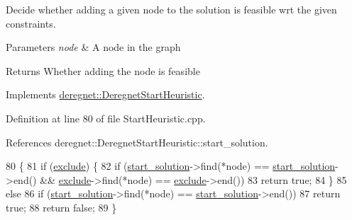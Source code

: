 Decide whether adding a given node to the solution is feasible wrt the given constraints. 


\begin{DoxyParams}{Parameters}
{\em node} & A node in the graph\\
\hline
\end{DoxyParams}
\begin{DoxyReturn}{Returns}
Whether adding the node is feasible 
\end{DoxyReturn}


Implements \hyperlink{classderegnet_1_1DeregnetStartHeuristic_ac296c4f122f7d3ad2fcc2cbb0d1b5379}{deregnet\+::\+Deregnet\+Start\+Heuristic}.



Definition at line 80 of file Start\+Heuristic.\+cpp.



References deregnet\+::\+Deregnet\+Start\+Heuristic\+::start\+\_\+solution.


\begin{DoxyCode}
80                                              \{
81     \textcolor{keywordflow}{if} (\hyperlink{classderegnet_1_1DeregnetStartHeuristic_aa22c6581cd404bf7ac325850b28dc951}{exclude}) \{
82         \textcolor{keywordflow}{if} (\hyperlink{classderegnet_1_1DeregnetStartHeuristic_a7450e11ca0a265b055f95e7832b65e2f}{start\_solution}->find(*node) == \hyperlink{classderegnet_1_1DeregnetStartHeuristic_a7450e11ca0a265b055f95e7832b65e2f}{start\_solution}->end() && 
      \hyperlink{classderegnet_1_1DeregnetStartHeuristic_aa22c6581cd404bf7ac325850b28dc951}{exclude}->find(*node) == \hyperlink{classderegnet_1_1DeregnetStartHeuristic_aa22c6581cd404bf7ac325850b28dc951}{exclude}->end())
83             \textcolor{keywordflow}{return} \textcolor{keyword}{true};
84         \}
85     \textcolor{keywordflow}{else}
86         \textcolor{keywordflow}{if} (\hyperlink{classderegnet_1_1DeregnetStartHeuristic_a7450e11ca0a265b055f95e7832b65e2f}{start\_solution}->find(*node) == \hyperlink{classderegnet_1_1DeregnetStartHeuristic_a7450e11ca0a265b055f95e7832b65e2f}{start\_solution}->end())
87             \textcolor{keywordflow}{return} \textcolor{keyword}{true};
88     \textcolor{keywordflow}{return} \textcolor{keyword}{false};
89 \}
\end{DoxyCode}
\mbox{\label{classderegnet_1_1StartHeuristic_a84ed02caf211e22b663e4e3c0d5b4f24}} 
